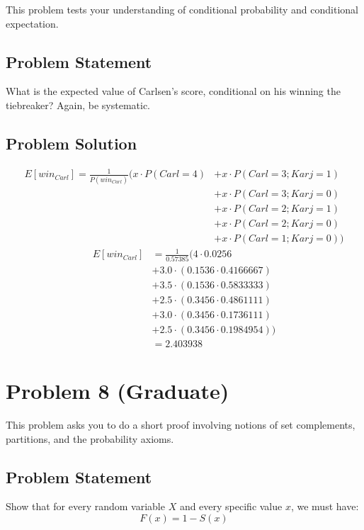 \documentclass[12pt]{article}
\theoremstyle{definition}
\begin{document}
This problem tests your understanding of conditional probability and conditional expectation.

\subsection*{Problem Statement}

What is the expected value of Carlsen's score, conditional on his winning the tiebreaker? Again, be systematic.

\subsection*{Problem Solution}
\begin{align*}
E[win_{Carl}] = \frac{1}{P(win_{Carl})}(x\cdot P(Carl = 4) &+ x\cdot P(Carl = 3; Karj = 1)\\
&+ x\cdot P(Carl = 3; Karj = 0) \\
&+ x\cdot P(Carl = 2; Karj = 1) \\
&+ x\cdot P(Carl = 2; Karj = 0) \\
&+ x\cdot P(Carl = 1; Karj = 0))
\end{align*}
\begin{align*}
E[win_{Carl}] &= \frac{1}{0.57385}(4 \cdot  0.0256 \\
&+ 3.0 \cdot  (0.1536 \cdot  0.4166667) \\
&+ 3.5\cdot (0.1536 \cdot  0.5833333)\\
&+ 2.5\cdot (0.3456\cdot 0.4861111) \\
&+ 3.0\cdot (0.3456\cdot 0.1736111)\\
&+ 2.5\cdot (0.3456\cdot 0.1984954))\\
&= 2.403938
\end{align*}


\newpage
\section*{Problem 8 (Graduate)}

This problem asks you to do a short proof involving notions of set complements, partitions, and the probability axioms.

\subsection*{Problem Statement}

Show that for every random variable $X$ and every specific value $x$, we must have:
$$
F(x) = 1 - S(x)
$$
\end{document}
